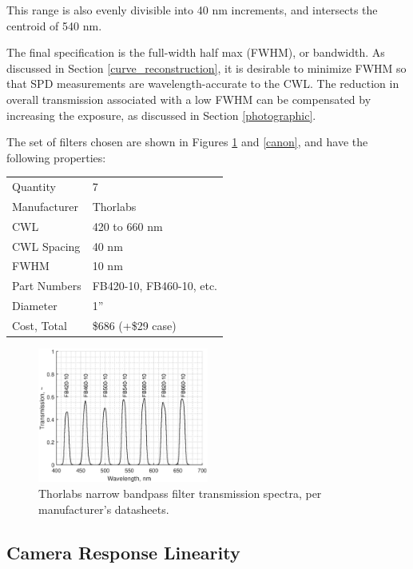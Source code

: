 \documentclass[twocolumn,10pt]{asme2ej}
\newcommand{\id}{\hspace{6 mm}}
\begin{document}
This range is also evenly divisible into 40 nm increments, and intersects the centroid of 540 nm.

\id The final specification is the full-width half max (FWHM), or bandwidth. As discussed in Section \ref{curve_reconstruction}, it is desirable to minimize FWHM so that SPD measurements are wavelength-accurate to the CWL. The reduction in overall transmission associated with a low FWHM can be compensated by increasing the exposure, as discussed in Section \ref{photographic}.

\id The set of filters chosen are shown in Figures \ref{thorlabs_filter_transmission_spectra} and \ref{canon}, and have the following properties:\\

\begin{tabular}{l | l}
Quantity & 7 \\
Manufacturer & Thorlabs \\
CWL & 420 to 660 nm \\
CWL Spacing & 40 nm \\
FWHM & 10 nm \\
Part Numbers & FB420-10, FB460-10, etc. \\
Diameter & 1'' \\
Cost, Total & \$686 (+\$29 case) \\
\end{tabular}

\begin{figure}
\centering
\includegraphics[width=0.5\textwidth]{thorlabs_filter_transmission_spectra.eps}
\caption{Thorlabs narrow bandpass filter transmission spectra, per manufacturer's datasheets. \cite{Thorlabs}}
\label{thorlabs_filter_transmission_spectra}
\end{figure}

\subsection{Camera Response Linearity}
\label{Camera Sensor Linearity}
\end{document}
